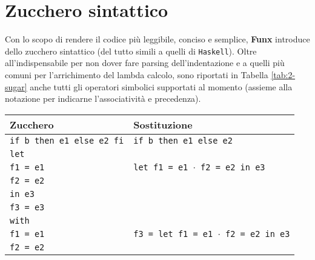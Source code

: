 \section{Zucchero sintattico}
\label{sec:2-syntactic-sugar}

Con lo scopo di rendere il codice più leggibile, conciso e semplice, \textbf{Funx} introduce
dello zucchero sintattico (del tutto simili a quelli di \texttt{Haskell}).
Oltre all'indispensabile per non dover fare parsing dell'indentazione
e a quelli più comuni per l'arrichimento del lambda calcolo, sono riportati in Tabella \ref{tab:2-sugar}
anche tutti gli operatori simbolici supportati al momento (assieme alla notazione per indicarne l'associatività e precedenza).

\newpage

\begin{table}[H]
    \begin{center}
        \renewcommand{\arraystretch}{1.3}
        \begin{tabularx}{\textwidth}{|p{16em}|X|}
            \hline
            \textbf{Zucchero}                & \textbf{Sostituzione}                                            \\
            \hline
            \texttt{if b then e1 else e2 fi} & \texttt{if b then e1 else e2}                                    \\
            \hline
            \texttt{let}                     &                                                                  \\
            \texttt{f1 = e1}                 & \texttt{let f1 = e1 $\cdot$ f2 = e2 in e3}                       \\
            \texttt{f2 = e2}                 &                                                                  \\
            \texttt{in e3}                   &                                                                  \\
            \hline
            \texttt{f3 = e3}                 &                                                                  \\
            \texttt{with}                    &                                                                  \\
            \texttt{f1 = e1}                 & \texttt{f3 = let f1 = e1 $\cdot$ f2 = e2 in e3}                  \\
            \texttt{f2 = e2}                 &                                                                  \\

\end{tabularx}
\end{center}
\end{table}
